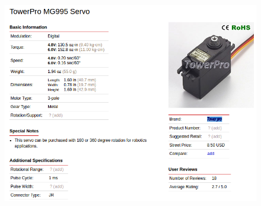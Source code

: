 \begin{figure}[H]
	\centering
	\includegraphics[scale=0.65]{./Resources/towerPro.png}
\end{figure}


